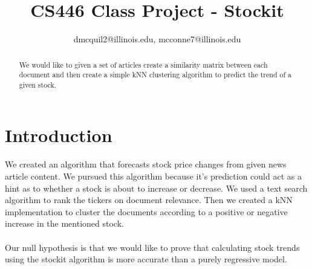 \documentclass[11pt,letterpaper]{article}
\newcommand{\blue}[1]{\textcolor{RoyalBlue}{#1}}
\newcommand{\instructions}[1]{\blue{\textit{#1}}}
\begin{document}
\title{CS446 Class Project - Stockit}
\author{dmcquil2@illinois.edu, mcconne7@illinois.edu}
\maketitle




\begin{abstract}
We would like to given a set of articles create a similarity matrix between each document and then create a simple kNN clustering algorithm to predict the trend of a given stock.
\end{abstract}

\section{Introduction}
\label{sec:introduction}
We created an algorithm that forecasts stock price changes from given news article content.
We pursued this algorithm because it's prediction could act as a hint as to
whether a stock is about to increase or decrease. We used a
text search algorithm to rank the tickers on document relevance. Then we created
a kNN implementation to cluster the documents according to a positive or negative increase in the mentioned stock. \\  \\
Our null hypothesis is that we would like to prove that calculating stock
trends using the stockit algorithm is more accurate than a purely regressive model.
\end{document}

